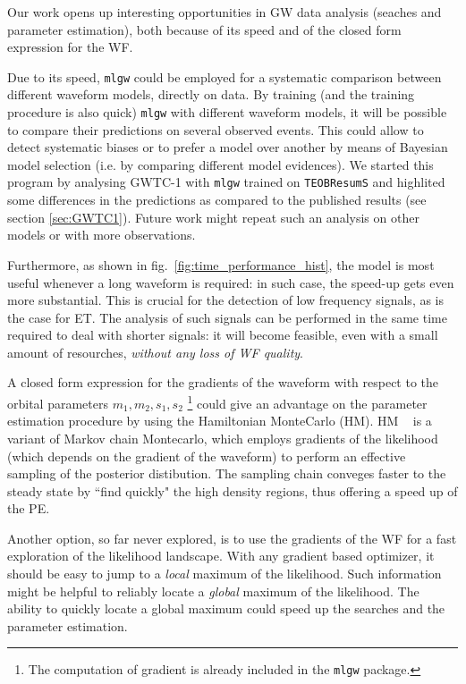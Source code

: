 Our work opens up interesting opportunities in GW data analysis (seaches and parameter estimation), both because of its speed and of the closed form expression for the WF.

Due to its speed, \texttt{mlgw} could be employed for a systematic comparison between different waveform models, directly on data.
By training (and the training procedure is also quick) \texttt{mlgw} with different waveform models, it will be possible to compare their predictions on several observed events. This could allow to detect systematic biases or to prefer a model over another by means of Bayesian model selection (i.e. by comparing different model evidences).
We started this program by analysing GWTC-1 with \texttt{mlgw} trained on \texttt{TEOBResumS} and highlited some differences in the predictions as compared to the published results (see section \ref{sec:GWTC1}). Future work might repeat such an analysis on other models or with more observations.
\par
Furthermore, as shown in fig.~\ref{fig:time_performance_hist}, the model is most useful whenever a long waveform is required: in such case, the speed-up gets even more substantial.
This is crucial for the detection of low frequency signals, as is the case for ET. The analysis of such signals can be performed in the same time required to deal with shorter signals: it will become feasible, even with a small amount of resourches, \textit{without any loss of WF quality}.
\par
A closed form expression for the gradients of the waveform with respect to the orbital parameters $m_1,m_2, {s}_1,{s}_2$
\footnote{The computation of gradient is already included in the \texttt{mlgw} package.}
could give an advantage on the parameter estimation procedure by using the Hamiltonian MonteCarlo (HM).
HM \cite{betancourt2017hamiltonianMC}~\cite{Porter2014Hamiltonian_MonteCarlo} is a variant of Markov chain Montecarlo, which employs gradients of the likelihood (which depends on the gradient of the waveform) to perform an effective sampling of the posterior distibution. The sampling chain conveges faster to the steady state by ``find quickly" the high density regions, thus offering a speed up of the PE.
\par
Another option, so far never explored, is to use the gradients of the WF for a fast exploration of the likelihood landscape. With any gradient based optimizer, it should be easy to jump to a \textit{local} maximum of the likelihood. Such information might be helpful to reliably locate a \textit{global} maximum of the likelihood.
The ability to quickly locate a global maximum could speed up the searches and the parameter estimation.
\par
{}



